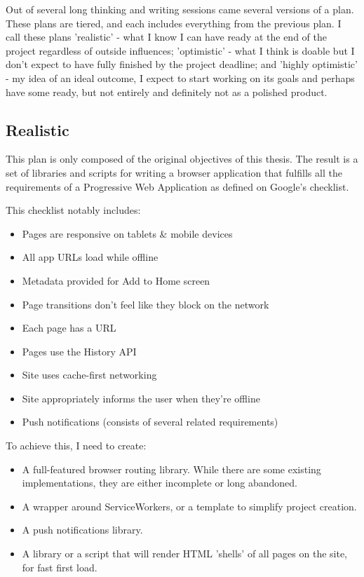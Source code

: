 \documentclass[11pt,a4paper]{scrartcl}
\begin{document}
Out of several long thinking and writing sessions came several versions of a
plan. These plans are tiered, and each includes everything from the previous
plan. I call these plans 'realistic' - what I know I can have ready at the end
of the project regardless of outside influences; 'optimistic' - what I think is
doable but I don't expect to have fully finished by the project deadline; and
'highly optimistic' - my idea of an ideal outcome, I expect to start working on
its goals and perhaps have some ready, but not entirely and definitely not as a
polished product.

\subsection{Realistic}
\label{sec:org804976a}
This plan is only composed of the original objectives of this thesis. The result
is a set of libraries and scripts for writing a browser application that
fulfills all the requirements of a Progressive Web Application as defined on
Google's checklist.

This checklist notably includes:
\begin{itemize}
\item Pages are responsive on tablets \& mobile devices
\item All app URLs load while offline
\item Metadata provided for Add to Home screen
\item Page transitions don't feel like they block on the network
\item Each page has a URL
\item Pages use the History API
\item Site uses cache-first networking
\item Site appropriately informs the user when they're offline
\item Push notifications (consists of several related requirements)
\end{itemize}

To achieve this, I need to create:
\begin{itemize}
\item A full-featured browser routing library. While there are some existing
implementations, they are either incomplete or long abandoned.
\item A wrapper around ServiceWorkers, or a template to simplify project creation.
\item A push notifications library.
\item A library or a script that will render HTML 'shells' of all pages on the site,
for fast first load.
\end{itemize}
\end{document}
